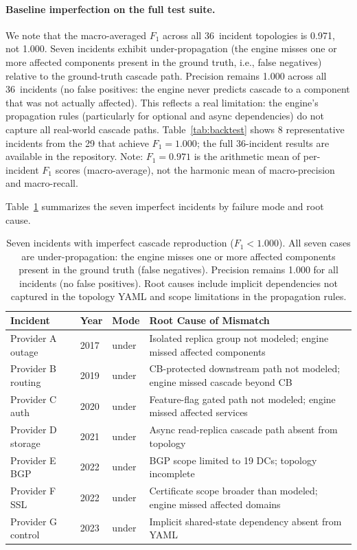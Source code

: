 \documentclass[10pt,twocolumn]{article}
\begin{document}
\paragraph{Baseline imperfection on the full test suite.}
We note that the macro-averaged $F_1$ across all 36~incident
topologies is 0.971, not 1.000.
Seven incidents exhibit under-propagation
(the engine misses one or more affected components present
in the ground truth, i.e., false negatives) relative to the
ground-truth cascade path. Precision remains 1.000 across all
36~incidents (no false positives: the engine never predicts
cascade to a component that was not actually affected).
This reflects a real limitation:
the engine's propagation rules (particularly for optional and
async dependencies) do not capture all real-world cascade paths.
Table~\ref{tab:backtest} shows 8 representative incidents from
the 29 that achieve $F_1 = 1.000$; the full 36-incident results
are available in the repository.
Note: $F_1 = 0.971$ is the arithmetic mean of per-incident $F_1$
scores (macro-average), not the harmonic mean of macro-precision
and macro-recall.

Table~\ref{tab:imperfect} summarizes the seven imperfect incidents by failure mode and root cause.

\begin{table}[h]
\centering
\caption{Seven incidents with imperfect cascade reproduction ($F_1 < 1.000$).
  All seven cases are under-propagation: the engine misses one or more
  affected components present in the ground truth (false negatives).
  Precision remains 1.000 for all incidents (no false positives).
  Root causes include implicit dependencies not captured in the
  topology YAML and scope limitations in the propagation rules.}
\label{tab:imperfect}
\small
\begin{tabular}{@{}lllp{5.5cm}@{}}
\toprule
\textbf{Incident} & \textbf{Year} & \textbf{Mode} & \textbf{Root Cause of Mismatch} \\
\midrule
Provider A outage  & 2017 & under & Isolated replica group not modeled; engine missed affected components \\
Provider B routing & 2019 & under & CB-protected downstream path not modeled; engine missed cascade beyond CB \\
Provider C auth    & 2020 & under & Feature-flag gated path not modeled; engine missed affected services \\
Provider D storage & 2021 & under & Async read-replica cascade path absent from topology \\
Provider E BGP     & 2022 & under & BGP scope limited to 19 DCs; topology incomplete \\
Provider F SSL     & 2022 & under & Certificate scope broader than modeled; engine missed affected domains \\
Provider G control & 2023 & under & Implicit shared-state dependency absent from YAML \\
\bottomrule
\end{tabular}
\end{table}
\end{document}
